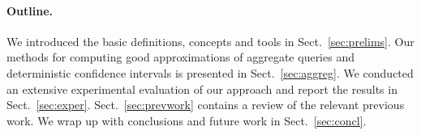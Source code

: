 \paragraph{Outline.} We introduced the basic definitions, concepts and tools in
Sect.~\ref{sec:prelims}. Our methods for computing good approximations of
aggregate queries and deterministic confidence intervals is presented in
Sect.~\ref{sec:aggreg}. We conducted an extensive experimental evaluation of our
approach and report the results in Sect.~\ref{sec:exper}.
Sect.~\ref{sec:prevwork} contains a review of the relevant previous work.  We
wrap up with conclusions and future work in Sect.~\ref{sec:concl}.

